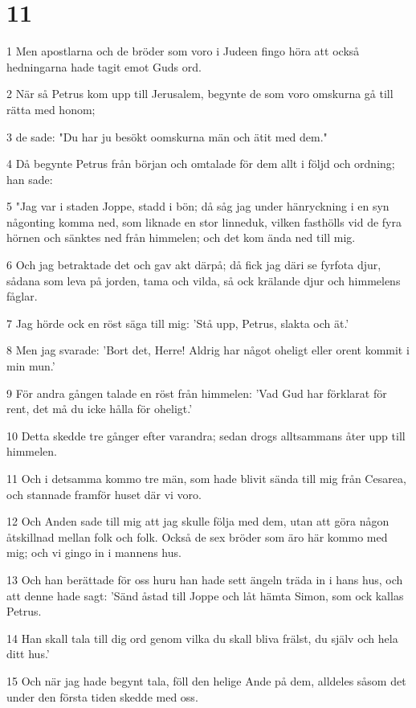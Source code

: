 \chapter{11}

\par 1 Men apostlarna och de bröder som voro i Judeen fingo höra att också hedningarna hade tagit emot Guds ord.
\par 2 När så Petrus kom upp till Jerusalem, begynte de som voro omskurna gå till rätta med honom;
\par 3 de sade: "Du har ju besökt oomskurna män och ätit med dem."
\par 4 Då begynte Petrus från början och omtalade för dem allt i följd och ordning; han sade:
\par 5 "Jag var i staden Joppe, stadd i bön; då såg jag under hänryckning i en syn någonting komma ned, som liknade en stor linneduk, vilken fasthölls vid de fyra hörnen och sänktes ned från himmelen; och det kom ända ned till mig.
\par 6 Och jag betraktade det och gav akt därpå; då fick jag däri se fyrfota djur, sådana som leva på jorden, tama och vilda, så ock krälande djur och himmelens fåglar.
\par 7 Jag hörde ock en röst säga till mig: 'Stå upp, Petrus, slakta och ät.'
\par 8 Men jag svarade: 'Bort det, Herre! Aldrig har något oheligt eller orent kommit i min mun.'
\par 9 För andra gången talade en röst från himmelen: 'Vad Gud har förklarat för rent, det må du icke hålla för oheligt.'
\par 10 Detta skedde tre gånger efter varandra; sedan drogs alltsammans åter upp till himmelen.
\par 11 Och i detsamma kommo tre män, som hade blivit sända till mig från Cesarea, och stannade framför huset där vi voro.
\par 12 Och Anden sade till mig att jag skulle följa med dem, utan att göra någon åtskillnad mellan folk och folk. Också de sex bröder som äro här kommo med mig; och vi gingo in i mannens hus.
\par 13 Och han berättade för oss huru han hade sett ängeln träda in i hans hus, och att denne hade sagt: 'Sänd åstad till Joppe och låt hämta Simon, som ock kallas Petrus.
\par 14 Han skall tala till dig ord genom vilka du skall bliva frälst, du själv och hela ditt hus.'
\par 15 Och när jag hade begynt tala, föll den helige Ande på dem, alldeles såsom det under den första tiden skedde med oss.

